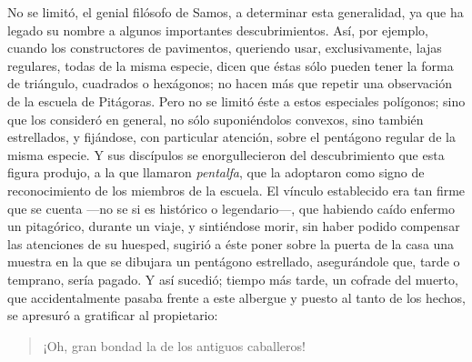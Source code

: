 \documentclass[a4paper, 12pt, draft]{article}
\begin{document}
{No se limitó, el genial filósofo de Samos, a determinar esta generalidad, ya que ha legado su nombre a algunos importantes descubrimientos. Así, por ejemplo, cuando los constructores de pavimentos, queriendo usar, exclusivamente, lajas regulares, todas de la misma especie, dicen que éstas sólo pueden tener la forma de triángulo, cuadrados o hexágonos; no hacen más que repetir una observación de la escuela de Pitágoras. Pero no se limitó éste a estos especiales polígonos; sino que los consideró en general, no sólo suponiéndolos convexos, sino también estrellados, y fijándose, con particular atención, sobre el pentágono regular de la misma especie. Y sus discípulos se enorgullecieron del descubrimiento que esta figura produjo, a la que llamaron \textit{ pentalfa}, que la adoptaron como signo de reconocimiento de los miembros de la escuela. El vínculo establecido era tan firme que se cuenta ---no se si es histórico o legendario---, que habiendo caído enfermo un pitagórico, durante un viaje, y sintiéndose morir, sin haber podido compensar las atenciones de su huesped, sugirió a éste poner sobre la puerta de la casa una muestra en la que se dibujara un pentágono estrellado, asegurándole que, tarde o temprano, sería pagado. Y así sucedió; tiempo más tarde, un cofrade del muerto, que accidentalmente pasaba frente a este albergue y puesto al tanto de los hechos, se apresuró a gratificar al propietario:

\begin{quote}

¡Oh, gran bondad la de los antiguos caballeros!

\end{quote}


}
\end{document}
